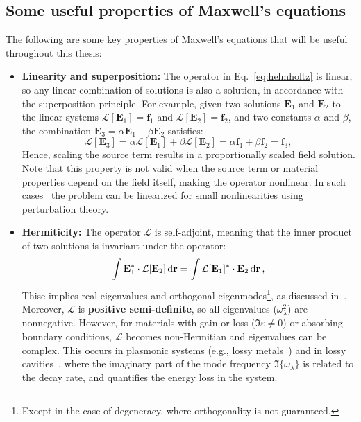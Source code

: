     \subsection*{Some useful properties of Maxwell's equations}
    The following are some key properties of Maxwell's equations that will be
    useful throughout this thesis:
    \begin{itemize}
        \item \textbf{Linearity and superposition:} The operator in
              Eq.~\eqref{eq:helmholtz} is linear, so any linear combination of solutions is
              also a solution, in accordance with the superposition principle.
              For example, given two solutions $\mathbf{E}_1$ and $\mathbf{E}_2$ to the
              linear systems $\mathcal{L}[\mathbf{E}_1] = \mathbf{f}_1$ and
              $\mathcal{L}[\mathbf{E}_2] = \mathbf{f}_2$,
              and two constants $\alpha$ and $\beta$, the combination $\mathbf{E}_3 =
                  \alpha \mathbf{E}_1 + \beta \mathbf{E}_2$ satisfies:
              \begin{equation}
                  \mathcal{L}[\mathbf{E}_3] = \alpha \mathcal{L}[\mathbf{E}_1] + \beta
                  \mathcal{L}[\mathbf{E}_2] = \alpha \mathbf{f}_1 + \beta \mathbf{f}_2 =
                  \mathbf{f}_3,
              \end{equation}
              Hence, scaling the source term results in a proportionally scaled field
              solution. Note that this property is not valid when the source term or material
              properties depend on the field itself, making the operator nonlinear. In such
              cases~\cite{ownpub4} the problem can be linearized for small nonlinearities
              using perturbation theory.

        \item \textbf{Hermiticity:} The operator $\mathcal{L}$ is self-adjoint,
              meaning that the inner product of two solutions is invariant under the
              operator:
              \begin{equation}
                  \int \mathbf{E}_1^* \cdot \mathcal{L}[\mathbf{E}_2] \mathop{}\!\text{d} \mathbf{r} =
                  \int \mathcal{L}[\mathbf{E}_1]^* \cdot \mathbf{E}_2 \mathop{}\!\text{d} \mathbf{r}\,,
              \end{equation}
              Thise implies real eigenvalues and orthogonal eigenmodes\footnote{Except in
                  the case of degeneracy, where orthogonality is not guaranteed.}, as discussed
              in~\cite{phot_crys}.
              Moreover, $\mathcal{L}$ is \textbf{positive semi-definite}, so all
              eigenvalues ($\omega_\lambda^2$) are nonnegative. However, for materials with
              gain or loss
              ($\Im{\varepsilon} \neq 0$) or absorbing boundary conditions, $\mathcal{L}$
              becomes non-Hermitian and eigenvalues can be complex. This occurs in plasmonic
              systems
              (e.g., lossy metals~\cite{ownpub0}) and in lossy cavities~\cite{ownpub4},
              where the imaginary part of the mode frequency $\Im\{\omega_\lambda\}$ is
              related to the decay rate, and quantifies the energy loss in the system.


\end{itemize}
